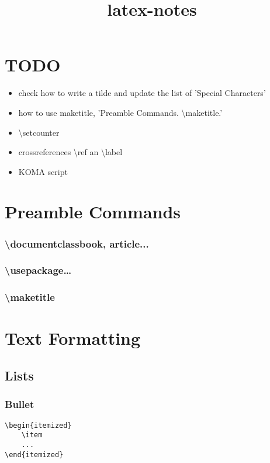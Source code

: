 \documentclass{report}
\title{latex-notes}
\begin{document}
\tableofcontents

\part{TODO}
\begin{itemize}
	\item check how to write a tilde and update the list of 'Special Characters'
	\item how to use maketitle, 'Preamble Commands. \textbackslash maketitle.'
	\item \textbackslash setcounter
	\item crossreferences \textbackslash ref an \textbackslash label
	\item KOMA script
\end{itemize}

\part{Preamble Commands}
\section{\textbackslash documentclass{book, article...}}
\section{\textbackslash usepackage{…}}
\section{\textbackslash maketitle}




\part{Text Formatting}



\chapter{Lists}


\section{Bullet}
\begin{verbatim}
\begin{itemized}
    \item 
    ...
\end{itemized}
\end{verbatim}
\end{document}
